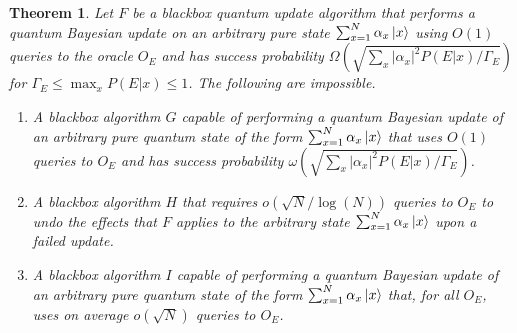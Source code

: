 \documentclass[aps,amsmath,onecolumn,amssymb]{revtex4}
\newtheorem{theorem}{Theorem}
\begin{document}
\begin{theorem}
Let $F$ be a blackbox quantum update algorithm that performs a quantum Bayesian update on an arbitrary pure state $\sum_{x=1}^N \alpha_x \left|x\right\rangle$ using $O(1)$ queries to the oracle $O_E$ and has success probability $\Omega(\sqrt{\sum_x |\alpha_x|^2 P(E|x)/\Gamma_E})$ for $\Gamma_E \le \max_x P(E|x)\le 1$.  The following are impossible.
\begin{enumerate}
\item A blackbox algorithm $G$ capable of performing a quantum Bayesian update of an arbitrary pure quantum state of the form $\sum_{x=1}^N \alpha_x \left|x\right\rangle$ that uses $O(1)$ queries to $O_E$ and has  success probability $\omega(\sqrt{\sum_x |\alpha_x|^2 P(E|x)/\Gamma_E})$.
\item A blackbox algorithm $H$ that requires $o(\sqrt{N}/\log(N))$ queries to $O_E$ to undo the effects that $F$ applies to the arbitrary state $\sum_{x=1}^N \alpha_x \left|x\right\rangle$ upon a failed update.
\item A blackbox algorithm $I$ capable of performing a quantum Bayesian update of an arbitrary pure quantum state of the form $\sum_{x=1}^N \alpha_x \left|x\right\rangle$ that, for all $O_E$, uses on average $o(\sqrt{N})$ queries to $O_E$.
\end{enumerate}
\end{theorem}
\end{document}

